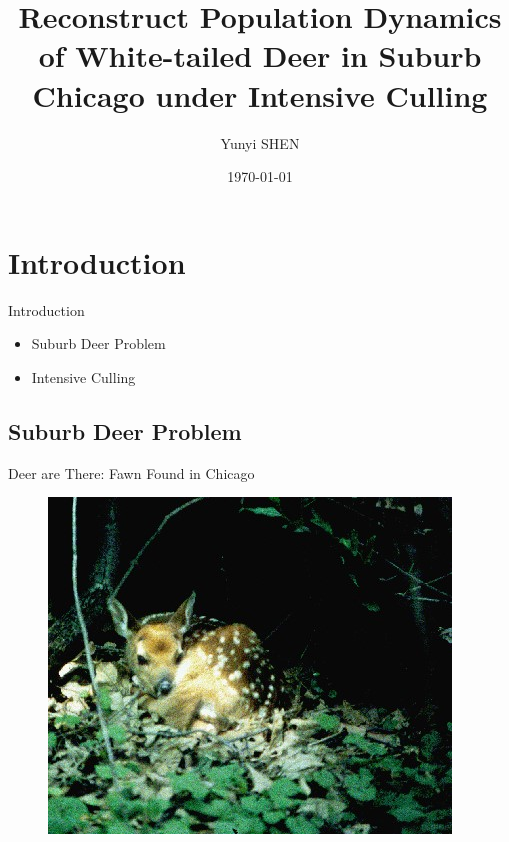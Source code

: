 \documentclass{beamer}
\title{Reconstruct Population Dynamics of White-tailed Deer in Suburb Chicago under Intensive Culling}
\author{Yunyi SHEN}
\institute{UW Madison\\ Department of Forest and Wildlife Ecology}
\date{\today}
\begin{document}
\frame{\titlepage}
\frame{\tableofcontents}

\section{Introduction}
\begin{frame}{Introduction}
	\begin{itemize}
		\item Suburb Deer Problem
		\item Intensive Culling
	\end{itemize}
\end{frame}

\subsection{Suburb Deer Problem}

\begin{frame}{Deer are There: Fawn Found in Chicago}
	\begin{figure}[ht]
		\centering
		\includegraphics[scale=.5]{fig/Chicago_deer/fawn.jpg}
		\label{fawn}
	\end{figure}
\end{frame}
\end{document}
